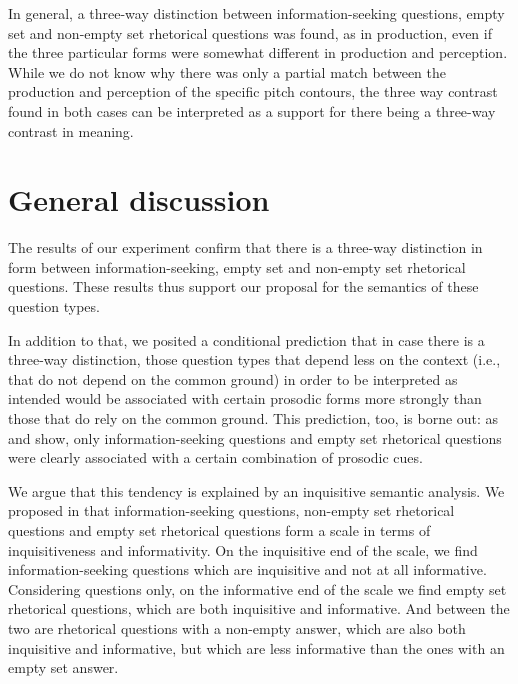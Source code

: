 \documentclass[output=paper,colorlinks,citecolor=brown            ,chinesefont]{langscibook}
\begin{document}
In general, a three-way distinction between information-seeking questions, empty set and non-empty set rhetorical questions was found, as in production, even if the three particular forms were somewhat different in production and perception. While we do not know why there was only a partial match between the production and perception of the specific pitch contours, the three way contrast found in both cases can be interpreted as a support for there being a three-way contrast in meaning.



\section{General discussion}
\label{sec:discussion}

The results of our experiment confirm that there is a three-way distinction in form between information-seeking, empty set and non-empty set rhetorical questions. These results thus support our proposal for the semantics of these question types.

In addition to that, we posited a conditional prediction that in case there is a three-way distinction, those question types that depend less on the context (i.e., that do not depend on the common ground) in order to be interpreted as intended would be associated with certain prosodic forms more strongly than those that do rely on the common ground. This prediction, too, is borne out: as  and  show, only information-seeking questions and empty set rhetorical questions were clearly associated with a certain combination of prosodic cues.

We argue that this tendency is explained by an inquisitive semantic analysis. We proposed in  that information-seeking questions, non-empty set rhetorical questions and empty set rhetorical questions form a scale in terms of inquisitiveness and informativity. On the inquisitive end of the scale, we find information-seeking questions which are inquisitive and not at all informative. Considering questions only, on the informative end of the scale we find empty set rhetorical questions, which are both inquisitive and informative. And between the two are rhetorical questions with a non-empty answer, which are also both inquisitive and informative, but which are less informative than the ones with an empty set answer.
\end{document}
